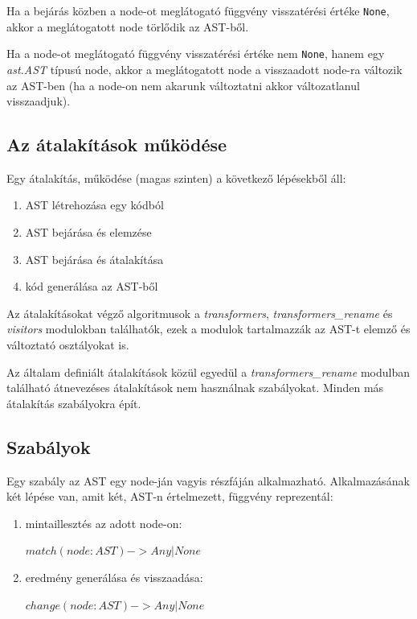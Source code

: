 Ha a bejárás közben a node-ot meglátogató függvény visszatérési értéke \texttt{None},
akkor a meglátogatott node törlődik az AST-ből.

Ha a node-ot meglátogató függvény visszatérési értéke nem \texttt{None},
hanem egy \emph{ast.AST} típusú node,
akkor a meglátogatott node a visszaadott node-ra változik az AST-ben
(ha a node-on nem akarunk változtatni akkor változatlanul visszaadjuk).

\subsection{Az átalakítások működése}

Egy átalakítás, működése (magas szinten) a következő lépésekből áll:

\begin{enumerate}
	\item AST létrehozása egy kódból
	\item AST bejárása és elemzése
	\item AST bejárása és átalakítása
	\item kód generálása az AST-ből
\end{enumerate}

Az átalakításokat végző algoritmusok a \emph{transformers}, \emph{transformers\_rename}
és \emph{visitors} modulokban találhatók, ezek a modulok tartalmazzák az AST-t
elemző és változtató osztályokat is.

Az általam definiált átalakítások közül egyedül
a \emph{transformers\_rename} modulban található
átnevezéses átalakítások nem használnak szabályokat.
Minden más átalakítás szabályokra épít.

\subsection{Szabályok}

Egy szabály az AST egy node-ján vagyis részfáján alkalmazható.
Alkalmazásának két lépése van, amit két, AST-n értelmezett, függvény reprezentál:

\begin{enumerate}
	\item mintaillesztés az adott node-on:
	
	\(match(node: AST) -> Any | None \)
	
	\item eredmény generálása és visszaadása:
	
	\(change(node: AST) -> Any | None \)
\end{enumerate}

